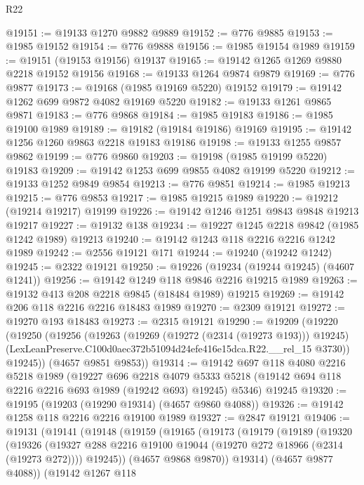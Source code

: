 \begin{lexlean}{R22}
\begin{coremodule}
@19151 := @19133 @1270 @9882 @9889
@19152 := @776 @9885
@19153 := @1985 @19152
@19154 := @776 @9888
@19156 := @1985 @19154 @1989
@19159 := @19151 (@19153 @19156) @19137
@19165 := @19142 @1265 @1269 @9880 @2218 @19152 @19156
@19168 := @19133 @1264 @9874 @9879
@19169 := @776 @9877
@19173 := @19168 (@1985 @19169 @5220) @19152
@19179 := @19142 @1262 @699 @9872 @4082 @19169 @5220
@19182 := @19133 @1261 @9865 @9871
@19183 := @776 @9868
@19184 := @1985 @19183
@19186 := @1985 @19100 @1989
@19189 := @19182 (@19184 @19186) @19169
@19195 := @19142 @1256 @1260 @9863 @2218 @19183 @19186
@19198 := @19133 @1255 @9857 @9862
@19199 := @776 @9860
@19203 := @19198 (@1985 @19199 @5220) @19183
@19209 := @19142 @1253 @699 @9855 @4082 @19199 @5220
@19212 := @19133 @1252 @9849 @9854
@19213 := @776 @9851
@19214 := @1985 @19213
@19215 := @776 @9853
@19217 := @1985 @19215 @1989
@19220 := @19212 (@19214 @19217) @19199
@19226 := @19142 @1246 @1251 @9843 @9848 @19213 @19217
@19227 := @19132 @138
@19234 := @19227 @1245 @2218 @9842 (@1985 @1242 @1989) @19213
@19240 := @19142 @1243 @118 @2216 @2216 @1242 @1989
@19242 := @2556 @19121 @171
@19244 := @19240 (@19242 @1242)
@19245 := @2322 @19121
@19250 := @19226 (@19234 (@19244 @19245) (@4607 @1241))
@19256 := @19142 @1249 @118 @9846 @2216 @19215 @1989
@19263 := @19132 @413 @208 @2218 @9845 (@18484 @1989) @19215
@19269 := @19142 @206 @118 @2216 @2216 @18483 @1989
@19270 := @2309 @19121
@19272 := @19270 @193 @18483
@19273 := @2315 @19121
@19290 := @19209
    (@19220
      (@19250
        (@19256
          (@19263
            (@19269 (@19272 (@2314 (@19273 @193))) @19245)
            (LexLeanPreserve.C100d0aec372b51094d24efe416e15dca.R22.__rel_15 @3730))
          @19245))
      (@4657 @9851 @9853))
@19314 := @19142
    @697
    @118
    @4080
    @2216
    @5218
    @1989
    (@19227
      @696
      @2218
      @4079
      @5333
      @5218
      (@19142 @694 @118 @2216 @2216 @693 @1989 (@19242 @693) @19245)
      @5346)
    @19245
@19320 := @19195 (@19203 (@19290 @19314) (@4657 @9860 @4088))
@19326 := @19142 @1258 @118 @2216 @2216 @19100 @1989
@19327 := @2847 @19121
@19406 := @19131
    (@19141
      (@19148
        (@19159
          (@19165
            (@19173
              (@19179
                (@19189
                  (@19320
                    (@19326
                      (@19327 @288 @2216 @19100 @19044 (@19270 @272 @18966 (@2314 (@19273 @272))))
                      @19245))
                  (@4657 @9868 @9870))
                @19314)
              (@4657 @9877 @4088))
            (@19142
              @1267
              @118

\end{coremodule}
\end{lexlean}
